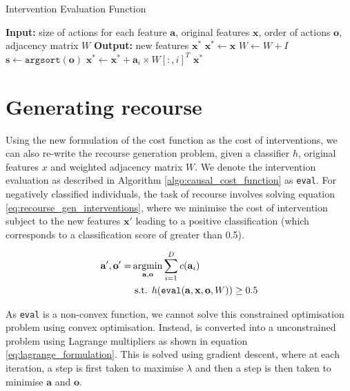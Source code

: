 \begin{algorithm}
	\caption{Intervention Evaluation Function}
	\begin{algorithmic}[1]
		\State \textbf{Input:} size of actions for each feature $\mathbf{a}$, original features $\mathbf{x}$, order of actions $\mathbf{o}$, adjacency matrix $W$
		\State \textbf{Output:} new features $\textbf{x}^*$
		\State $\textbf{x}^* \leftarrow \textbf{x}$
		\State $W \leftarrow W + I$ 
		\State $\mathbf{s} \leftarrow \texttt{argsort}(\mathbf{o})$
		\State $\textbf{x}^* \leftarrow \textbf{x}^* + \mathbf{a}_i \times W[:,i]^{T}$ 
		\EndFor
		\State \Return $\mathbf{x}^*$
		\EndFunction
	\end{algorithmic}
	\label{algo:causal_cost_function}
\end{algorithm}

\section{Generating recourse}

Using the new formulation of the cost function as the cost of interventions, we can also re-write the recourse generation problem, given a classifier $h$, original features $x$ and weighted adjacency matrix $W$. We denote the intervention evaluation as described in Algorithm \ref{algo:causal_cost_function} as \texttt{eval}. For negatively classified individuals, the task of recourse involves solving equation \ref{eq:recourse_gen_interventions}, where we minimise the cost of intervention subject to the new features $\mathbf{x}'$ leading to a positive classification (which corresponds to a classification score of greater than 0.5).

\begin{align} \label{eq:recourse_gen_interventions}
	\mathbf{a}', \mathbf{o}' = & \operatorname*{argmin}_{\mathbf{a, o}} \sum_{i=1}^D c(\mathbf{a}_i) \\ \nonumber
	& \text{ s.t. } h(\texttt{eval}(\mathbf{a, x, o}, W)) \geq 0.5
\end{align}

As \texttt{eval} is a non-convex function, we cannot solve this constrained optimisation problem using convex optimisation. Instead, is converted into a unconstrained problem using Lagrange multipliers as shown in equation \ref{eq:lagrange_formulation}. This is solved using gradient descent, where at each iteration, a step is first taken to maximise $\lambda$ and then a step is then taken to minimise $\mathbf{a}$ and $\mathbf{o}$.

